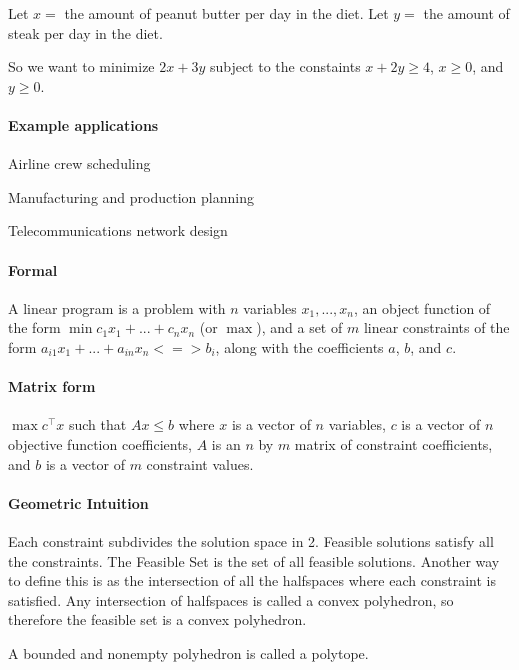 \documentclass[a4paper]{article}
\newenvironment{itemize*}%
  {\begin{itemize}%
    \setlength{\itemsep}{0pt}%
    \setlength{\parsep}{0pt}%
    \setlength{\parskip}{0pt}}%
  {\end{itemize}}
\begin{document}
Let $x=$ the amount of peanut butter per day in the diet.
Let $y=$ the amount of steak per day in the diet.

So we want to minimize $2x+3y$ subject to the constaints $x+2y \ge 4$, $x \ge 0$, and $y \ge 0$.

\paragraph{Example applications}

\begin{itemize*}
  \item Airline crew scheduling
  \item Manufacturing and production planning
  \item Telecommunications network design
\end{itemize*}

\paragraph{Formal}
A linear program is a problem with $n$ variables $x_1,...,x_n$, an object function of the form $\min c_1x_1+...+c_nx_n$ (or $\max$), and a set of $m$ linear constraints of the form $a_{i1}x_1+...+a_{in}x_n <=> b_i$, along with the coefficients $a$, $b$, and $c$.

\paragraph{Matrix form}

$\max c^\intercal x$ such that $Ax \le b$ where $x$ is a vector of $n$ variables, $c$ is a vector of $n$ objective function coefficients, $A$ is an $n$ by $m$ matrix of constraint coefficients, and $b$ is a vector of $m$ constraint values.

\paragraph{Geometric Intuition}
Each constraint subdivides the solution space in 2.
Feasible solutions satisfy all the constraints.
The Feasible Set is the set of all feasible solutions.
Another way to define this is as the intersection of all the halfspaces where each constraint is satisfied.
Any intersection of halfspaces is called a convex polyhedron, so therefore the feasible set is a convex polyhedron.

A bounded and nonempty polyhedron is called a polytope.
\end{document}
